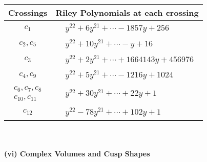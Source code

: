 \documentclass[1p]{elsarticle_modified}
\theoremstyle{definition}
\begin{document}
\begin{tabular}{m{50pt}|m{274pt}}
Crossings & \hspace{64pt}Riley Polynomials at each crossing \\
\hline $$\begin{aligned}c_{1}\end{aligned}$$&$\begin{aligned}
&y^{22}+6 y^{21}+\cdots-1857 y+256
\end{aligned}$\\
\hline $$\begin{aligned}c_{2},c_{5}\end{aligned}$$&$\begin{aligned}
&y^{22}+10 y^{21}+\cdots- y+16
\end{aligned}$\\
\hline $$\begin{aligned}c_{3}\end{aligned}$$&$\begin{aligned}
&y^{22}+2 y^{21}+\cdots+1664143 y+456976
\end{aligned}$\\
\hline $$\begin{aligned}c_{4},c_{9}\end{aligned}$$&$\begin{aligned}
&y^{22}+5 y^{21}+\cdots-1216 y+1024
\end{aligned}$\\
\hline $$\begin{aligned}c_{6},c_{7},c_{8}\\c_{10},c_{11}\end{aligned}$$&$\begin{aligned}
&y^{22}+30 y^{21}+\cdots+22 y+1
\end{aligned}$\\
\hline $$\begin{aligned}c_{12}\end{aligned}$$&$\begin{aligned}
&y^{22}-78 y^{21}+\cdots+102 y+1
\end{aligned}$\\
\hline
\end{tabular}\\~\\
\newpage\flushleft \textbf{(vi) Complex Volumes and Cusp Shapes}
\end{document}

